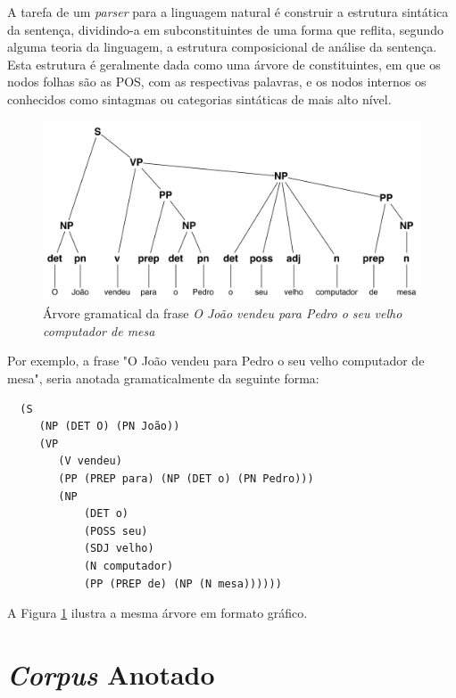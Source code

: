 A tarefa de um \emph{parser} para a linguagem natural é construir a estrutura sintática da sentença, dividindo-a em subconstituintes de uma forma que reflita, segundo alguma teoria da linguagem, a estrutura composicional de análise da sentença. Esta estrutura é geralmente dada como uma árvore de constituintes, em que os nodos folhas são as POS, com as respectivas palavras, e os nodos internos os conhecidos como sintagmas ou categorias sintáticas de mais alto nível.

\begin{figure}
	\begin{center}
		\includegraphics[scale=0.5]{tree.pdf}
		\caption{\label{tree} Árvore gramatical da frase \emph{O João vendeu para Pedro o seu velho computador de mesa}}

	\end{center}
\end{figure}

Por exemplo, a frase "O João vendeu para Pedro o seu velho computador de mesa", seria anotada gramaticalmente da seguinte forma:

\begin{verbatim}
  (S
     (NP (DET O) (PN João))
     (VP
        (V vendeu)
        (PP (PREP para) (NP (DET o) (PN Pedro)))
        (NP
            (DET o)
            (POSS seu)
            (SDJ velho)
            (N computador)
            (PP (PREP de) (NP (N mesa))))))
\end{verbatim}

			
A Figura \ref{tree} ilustra a mesma árvore em formato gráfico.



\section{\emph{Corpus} Anotado} %
\label{sec:corpus_anotado}

